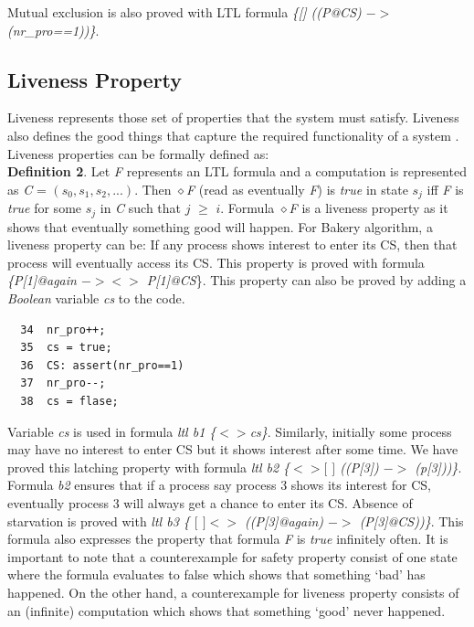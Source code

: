 \documentclass[conference]{IEEEtran}
\begin{document}
Mutual exclusion is also proved with LTL formula \emph{\{[] ((P@CS) $->$ (nr\_pro==1))\}}.

\subsection{Liveness Property}
Liveness represents those set of properties that the system must satisfy. Liveness also defines the good things that capture the 
required functionality of a system \cite{7}. Liveness properties can be formally defined as:\\
\textbf{Definition 2}. Let \emph{F} represents an LTL formula and a computation is represented as \emph{C} = $(s_0, s_1, s_2,...)$. 
Then $\diamond$\emph{F} (read as eventually \emph{F}) is \emph{true} in state $s_j$ iff \emph{F} is \emph{true} for some $s_j$ in \emph{C} such that 
$j$ $\geq$ $i$.
Formula $\diamond$\emph{F} is a liveness property as it shows that eventually something good will happen. For Bakery algorithm, a liveness property 
can be: If any process shows interest to enter its CS, then that process will eventually access its CS. This property is proved with 
formula \emph{\{P[1]@again  $-> <>$ P[1]@CS}\}. This property can also be proved by adding a \emph{Boolean} variable \emph{cs} to the code.
{\small \begin{verbatim}
  34  nr_pro++;
  35  cs = true;
  36  CS: assert(nr_pro==1)
  37  nr_pro--;
  38  cs = flase; 
\end{verbatim}}

Variable \emph{cs} is used in formula \emph{ltl b1 \{$<>$cs\}}. Similarly, initially some process may have no interest to enter CS but it shows 
interest after some time. We have proved this latching property with formula \emph{ltl b2 \{$<>[$ $]$ ((P[3]\@again) $->$ (p[3]\@CS))\}}. Formula 
\emph{b2} ensures that if a process say process 3 shows its interest for CS, eventually process 3 will always get a chance to enter its CS. 
Absence of starvation is proved with \emph{ltl b3 \{ $[$ $]<>$ ((P[3]@again) $->$ (P[3]@CS))\}}. This formula also expresses the property that 
formula \emph{F} is \emph{true} infinitely often. It is important to note that a counterexample for safety property consist of one state where the 
formula evaluates to false which shows that something ‘bad’ has happened. On the other hand, a counterexample for liveness property consists 
of an (infinite) computation which shows that something ‘good’ never happened.
\end{document}
